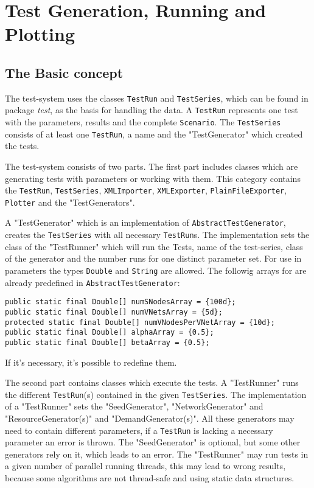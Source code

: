 \section{Test Generation, Running and Plotting}

\subsection{The Basic concept}
The test-system uses the classes \texttt{TestRun} and \texttt{TestSeries}, which can be found in package \textit{test}, as the basis for handling the data.
A \texttt{TestRun} represents one test with the parameters, results and the complete \texttt{Scenario}.
The \texttt{TestSeries} consists of at least one \texttt{TestRun}, a name and the "TestGenerator" which created the tests.

The test-system consists of two parts.
The first part includes classes which are generating tests with parameters or working with them.
This category contains the \texttt{TestRun}, \texttt{TestSeries}, \texttt{XMLImporter}, \texttt{XMLExporter}, \texttt{PlainFileExporter}, 
\texttt{Plotter} and the "TestGenerators". 

A "TestGenerator" which is an implementation of \texttt{AbstractTestGenerator}, creates the \texttt{TestSeries} with all necessary \texttt{TestRun}s. 
The implementation sets the class of the "TestRunner" which will run the Tests, name of the test-series, class of the generator and the number 
runs for one distinct parameter set.
For use in parameters the types \texttt{Double} and \texttt{String} are allowed.
The followig arrays for are already predefined in \texttt{AbstractTestGenerator}:
\begin{lstlisting}
public static final Double[] numSNodesArray = {100d};
public static final Double[] numVNetsArray = {5d};
protected static final Double[] numVNodesPerVNetArray = {10d};
public static final Double[] alphaArray = {0.5};
public static final Double[] betaArray = {0.5};
\end{lstlisting}
If it's necessary, it's possible to redefine them.


The second part contains classes which execute the tests.
A "TestRunner" runs the different \texttt{TestRun}(s) contained in the given \texttt{TestSeries}.
The implementation of a "TestRunner" sets the "SeedGenerator", "NetworkGenerator" and "ResourceGenerator(s)" and "DemandGenerator(s)".
All these generators may need to contain different parameters, if a \texttt{TestRun} is lacking a necessary parameter an error is thrown.
The "SeedGenerator" is optional, but some other generators rely on it, which leads to an error.
The "TestRunner" may run tests in a given number of parallel running threads, this may lead to wrong results, because some
algorithms are not thread-safe and using static data structures.


